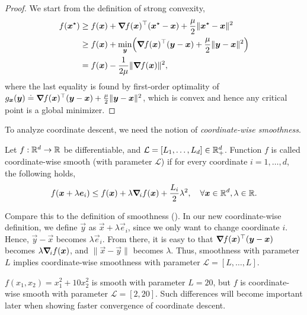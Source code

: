 \begin{proof}
    We start from the definition of strong convexity,
    \begin{align*}
        f(\vec{x}^\star) & \geq f(\vec{x}) + \transpose{\grad{f(\vec{x})}{}}(\vec{x}^\star - \vec{x}) + \frac{\mu}{2} \| \vec{x}^\star - \vec{x} \|^2              \\
                         & \geq f(\vec{x}) + \min_{\vec{y}} \lft( \transpose{\grad{f(\vec{x})}{}}(\vec{y}-\vec{x}) + \frac{\mu}{2} \| \vec{y} - \vec{x} \|^2 \rgt) \\
                         & = f(\vec{x}) - \frac{1}{2 \mu} \| \grad{f(\vec{x})}{} \|^2,
    \end{align*}
    where the last equality is found by first-order optimality of $g_{\vec{x}}(\vec{y}) \doteq
        \transpose{\grad{f(\vec{x})}{}}(\vec{y} - \vec{x}) + \frac{\mu}{2} \| \vec{y} - \vec{x} \|^2$,
    which is convex and hence any critical point is a global minimizer.
\end{proof}

To analyze coordinate descent, we need the notion of \textit{coordinate-wise smoothness}.

\begin{definition}
    Let $f: \R^d \to \R$ be differentiable, and $\mathcal{L} = [L_1, \ldots, L_d] \in \R^d_+$.
    Function $f$ is called coordinate-wise smooth (with parameter $\mathcal{L}$) if for every
    coordinate $i=1,\ldots,d$, the following holds, \[
        f(\vec{x} + \lambda \vec{e}_i) \leq f(\vec{x}) + \lambda \grad{f(\vec{x})}{i} + \frac{L_i}{2} \lambda^2, \quad \forall \vec{x}\in \R^d, \lambda \in \R.
    \]
\end{definition}

Compare this to the definition of smoothness (). In our new coordinate-wise
definition, we define $\vec{y}$ as $\vec{x} + \lambda \vec{e}_i$, since we only want to change
coordinate $i$. Hence, $\vec{y}-\vec{x}$ becomes $\lambda \vec{e}_i$. From there, it is easy to
that $\transpose{\grad{f(\vec{x})}{}}(\vec{y} - \vec{x})$ becomes $\lambda \grad{f(\vec{x})}{i}$,
and $\| \vec{x}-\vec{y} \|$ becomes $\lambda$. Thus, smoothness with parameter $L$ implies
coordinate-wise smoothness with parameter $\mathcal{L} = [L, \ldots, L]$.

\begin{example}
    $f(x_1, x_2) = x_1^2 + 10x_2^2$ is smooth with parameter $L = 20$, but $f$ is coordinate-wise
    smooth with parameter $\mathcal{L} = [2, 20]$. Such differences will become important later when
    showing faster convergence of coordinate descent.
\end{example}

